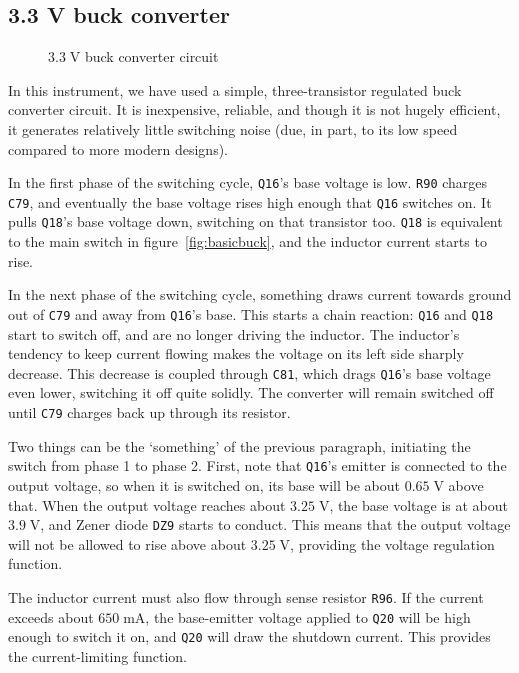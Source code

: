 \documentclass[article]{memoir}
\newcommand{\refdes}[1]{\texttt{#1}}
\newcommand{\mr}[1]{\ensuremath{\mathrm{#1}}}
\begin{document}
\begin{multicols}{2}
\subsection{3.3 V buck converter}

\begin{figure}[H]
\centering
{}
\caption{$3.3\;\mr{V}$ buck converter circuit}
\label{fig:3v3buck}
\end{figure}

In this instrument, we have used a simple, three-transistor regulated buck
converter circuit. It is inexpensive, reliable, and though it is not hugely
efficient, it generates relatively little switching noise (due, in part, to
its low speed compared to more modern designs).

In the first phase of the switching cycle, \refdes{Q16}'s base voltage is
low. \refdes{R90} charges \refdes{C79}, and eventually the base voltage rises
high enough that \refdes{Q16} switches on. It pulls \refdes{Q18}'s base voltage
down, switching on that transistor too. \refdes{Q18} is equivalent to the main
switch in figure~\ref{fig:basicbuck}, and the inductor current starts to rise.

In the next phase of the switching cycle, something draws current towards ground
out of \refdes{C79} and away from \refdes{Q16}'s base. This starts a chain reaction:
\refdes{Q16} and \refdes{Q18} start to switch off, and are no longer driving the
inductor. The inductor's tendency to keep current flowing makes the voltage on its
left side sharply decrease. This decrease is coupled through \refdes{C81}, which
drags \refdes{Q16}'s base voltage even lower, switching it off quite solidly.
The converter will remain switched off until \refdes{C79} charges back up through
its resistor.

Two things can be the `something' of the previous paragraph, initiating the
switch from phase 1 to phase 2. First, note that \refdes{Q16}'s emitter is
connected to the output voltage, so when it is switched on, its base will be
about $0.65\;\mr{V}$ above that. When the output voltage reaches about
$3.25\;\mr{V}$, the base voltage is at about $3.9\;\mr{V}$, and Zener diode
\refdes{DZ9} starts to conduct. This means that the output voltage will not be
allowed to rise above about $3.25\;\mr{V}$, providing the voltage regulation
function.

The inductor current must also flow through sense resistor \refdes{R96}. If the
current exceeds about $650\;\mr{mA}$, the base-emitter voltage applied to
\refdes{Q20} will be high enough to switch it on, and \refdes{Q20} will draw the
shutdown current. This provides the current-limiting function.


\end{multicols}
\end{document}
